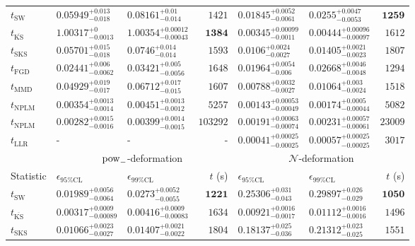 \begin{tabular}{l|llr|llr}
	\midrule
	$t_{\mathrm{SW}}$ & $0.05949_{-0.018}^{+0.013}$ & $0.08161_{-0.014}^{+0.01}$ & $1421$ & $0.01845_{-0.0061}^{+0.0052}$ & $0.0255_{-0.0053}^{+0.0047}$ & ${\mathbf{1259}}$ \\
	$t_{\overline{\mathrm{KS}}}$ & $1.00317_{-0.0013}^{+0}$ & $1.00354_{-0.00043}^{+0.00012}$ & ${\mathbf{1384}}$ & ${\mathbf{0.00345_{-0.0011}^{+0.00099}}}$ & ${\mathbf{0.00444_{-0.00097}^{+0.00096}}}$ & $1612$ \\
	$t_{\mathrm{SKS}}$ & $0.05701_{-0.018}^{+0.015}$ & $0.0746_{-0.014}^{+0.014}$ & $1593$ & $0.0106_{-0.0027}^{+0.0024}$ & $0.01405_{-0.0023}^{+0.0021}$ & $1807$ \\
	$t_{\mathrm{FGD}}$ & ${\mathbf{0.02441_{-0.0062}^{+0.006}}}$ & ${\mathbf{0.03421_{-0.0056}^{+0.005}}}$ & $1648$ & $0.01964_{-0.006}^{+0.0054}$ & $0.02668_{-0.0048}^{+0.0046}$ & $1294$ \\
	$t_{\mathrm{MMD}}$ & $0.04929_{-0.017}^{+0.019}$ & $0.06712_{-0.015}^{+0.017}$ & $1607$ & $0.00788_{-0.0027}^{+0.0032}$ & $0.01064_{-0.0024}^{+0.003}$ & $1518$ \\
\rowcolor{red!35}	$t_{\mathrm{NPLM}}$ & $0.00354_{-0.0014}^{+0.0013}$ & $0.00451_{-0.0012}^{+0.0013}$ & $5257$ & $0.00143_{-0.00049}^{+0.00053}$ & $0.00174_{-0.00044}^{+0.0005}$ & $5082$ \\
\rowcolor{blue!35}	$t_{\mathrm{NPLM}}$ & $0.00282_{-0.0016}^{+0.0015}$ & $0.00399_{-0.0015}^{+0.0014}$ & $103292$ & $0.00191_{-0.00074}^{+0.00063}$ & $0.00231_{-0.00061}^{+0.00057}$ & $23009$ \\
	$t_{\mathrm{LLR}}$ & - & - & - & $0.00041_{-0.00025}^{+0.00025}$ & $0.00057_{-0.00025}^{+0.00025}$ & $3017$ \\
	\toprule
	\multicolumn{1}{c}{} & \multicolumn{3}{c}{$\rm{pow}_{-}$-deformation} & \multicolumn{3}{c}{$\mathcal{N}$-deformation} \\
	Statistic & $\epsilon_{95\%\mathrm{CL}}$ & $\epsilon_{99\%\mathrm{CL}}$ & $t$ (s) & $\epsilon_{95\%\mathrm{CL}}$ & $\epsilon_{99\%\mathrm{CL}}$ & $t$ (s) \\
	\midrule
	$t_{\mathrm{SW}}$ & $0.01989_{-0.0064}^{+0.0056}$ & $0.0273_{-0.0055}^{+0.0052}$ & ${\mathbf{1221}}$ & $0.25306_{-0.043}^{+0.031}$ & $0.29897_{-0.029}^{+0.026}$ & ${\mathbf{1050}}$ \\
	$t_{\overline{\mathrm{KS}}}$ & ${\mathbf{0.00317_{-0.00089}^{+0.0009}}}$ & ${\mathbf{0.00416_{-0.00083}^{+0.0009}}}$ & $1634$ & ${\mathbf{0.00921_{-0.0017}^{+0.0016}}}$ & ${\mathbf{0.01112_{-0.0016}^{+0.0016}}}$ & $1496$ \\
	$t_{\mathrm{SKS}}$ & $0.01066_{-0.0027}^{+0.0023}$ & $0.01407_{-0.0022}^{+0.0021}$ & $1804$ & $0.18137_{-0.036}^{+0.025}$ & $0.21312_{-0.025}^{+0.023}$ & $1551$ \\

\end{tabular}
